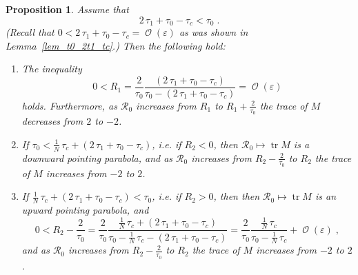 \documentclass{amsart}
\theoremstyle{plain} %
\newtheorem{proposition}[theorem]{Proposition}
\begin{document}
\begin{proposition}
  \label{prop_trM_vs_R0}
  Assume that
  \begin{equation*}
    2\,\tau_1 + \tau_0 - \tau_c
    <
    \tau_0
    \;.
  \end{equation*}
  (Recall that 
  $
  0 <
  2\,\tau_1 + \tau_0 - \tau_c
  = \operatorname{\mathcal{O}}(\varepsilon)
  $
  as was shown in Lemma~\ref{lem_t0_2t1_tc}.)
  Then the following hold:
  \begin{enumerate}
    \item
      \label{item_1_prop_trM_vs_R0}
      The inequality
      \begin{equation*}
 0 < R_1
 =
 \frac{2}{\tau_0}
 \frac{
 (2\,\tau_1 + \tau_0 - \tau_c)
 }{
 \tau_0
 -
 (2\,\tau_1 + \tau_0 - \tau_c)
 }
 =
 \operatorname{\mathcal{O}}(\varepsilon)
      \end{equation*}
      holds.
      Furthermore,
      as ${\mathcal R}_0$ increases from $R_1$ to $R_1 + \frac{2}{\tau_0}$
      the trace of $M$ decreases from $2$ to $-2$.
    \item
      \label{item_2_prop_trM_vs_R0}
      If
      $
      \tau_0
      <
      \frac{1}{N}\,\tau_c
      +
      (2\,\tau_1 + \tau_0 - \tau_c)
      $, i.e. if $R_2 < 0$,
      then ${\mathcal R}_0 \mapsto \operatorname{tr} M$ is a downward pointing parabola,
      and
      as ${\mathcal R}_0$ increases from $R_2 - \frac{2}{\tau_0}$ to $R_2$
      the trace of $M$ increases from $-2$ to $2$.
    \item
      \label{item_3_prop_trM_vs_R0}
      If
      $
      \frac{1}{N}\,\tau_c
      +
      (2\,\tau_1 + \tau_0 - \tau_c)
      <
      \tau_0
      $, i.e. if $R_2 > 0$, then
      then ${\mathcal R}_0 \mapsto \operatorname{tr} M$ is an upward pointing parabola,
      and
      \begin{equation*}
 0
 <
 R_2 - \frac{2}{\tau_0}
 =
 \frac{2}{\tau_0}
 \frac{
 \frac{1}{N}\,\tau_c
 +
 (2\,\tau_1 + \tau_0 - \tau_c)
 }{
 \tau_0 - \frac{1}{N}\,\tau_c
 -
 (2\,\tau_1 + \tau_0 - \tau_c)
 }
 =
 \frac{2}{\tau_0}
 \frac{
 \frac{1}{N}\,\tau_c
 }{
 \tau_0 - \frac{1}{N}\,\tau_c
 }
 +
 \operatorname{\mathcal{O}}(\varepsilon)
 \;,
      \end{equation*}
      and
      as ${\mathcal R}_0$ increases from $R_2 - \frac{2}{\tau_0}$ to $R_2$
      the trace of $M$ increases from $-2$ to $2$.
  \end{enumerate}
\end{proposition}
\end{document}
